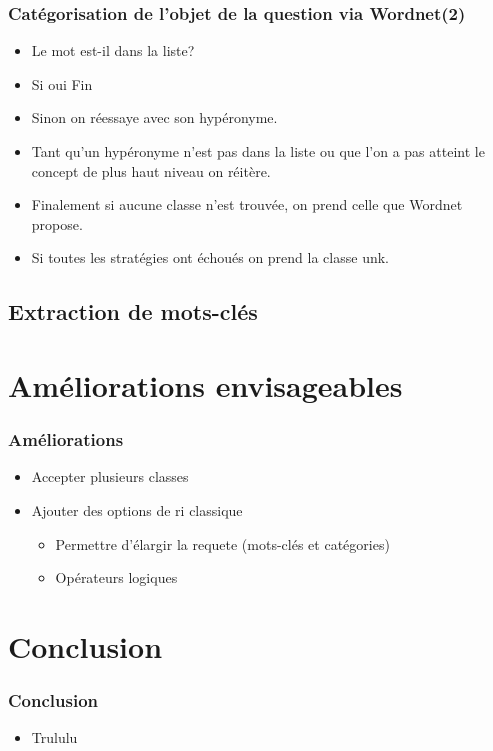 \documentclass[xcolor=dvipsnames]{beamer}
\begin{document}
\frame
{
    \frametitle{Catégorisation de l'objet de la question via Wordnet(2)}
    \begin{itemize}
        \item Le mot est-il dans la liste?
        \item Si oui Fin
        \item Sinon on réessaye avec son hypéronyme.
        \item Tant qu'un hypéronyme n'est pas dans la liste ou que l'on a pas atteint le concept de plus haut niveau on réitère.
        \item Finalement si aucune classe n'est trouvée, on prend celle que Wordnet propose.
        \item Si toutes les stratégies ont échoués on prend la classe unk.
    \end{itemize}
}

\subsection{Extraction de mots-clés}

\section{Améliorations envisageables}
\frame
{
    \frametitle{Améliorations}
    \begin{itemize}
        \item Accepter plusieurs classes
        \item Ajouter des options de ri classique
        \begin{itemize}
            \item Permettre d'élargir la requete (mots-clés et catégories)
            \item Opérateurs logiques
        \end{itemize}
    \end{itemize}
}
\section{Conclusion}
\frame
{
    \frametitle{Conclusion}
    \begin{itemize}
      \item<1-> Trululu
    \end{itemize}
}
\end{document}
